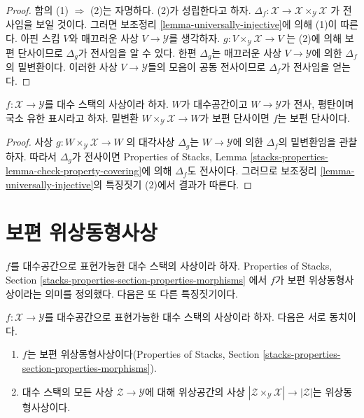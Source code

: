 \begin{proof}
함의 (1) $\Rightarrow$ (2)는 자명하다. (2)가 성립한다고 하자.
$\Delta_f : \mathcal{X} \to \mathcal{X} \times_\mathcal{Y} \mathcal{X}$
가 전사임을 보일 것이다. 그러면 보조정리
\ref{lemma-universally-injective}에 의해 (1)이 따른다.
아핀 스킴 $V$와 매끄러운 사상 $V \to \mathcal{Y}$를 생각하자.
$g : V \times_\mathcal{Y} \mathcal{X} \to V$
는 (2)에 의해 보편 단사이므로 $\Delta_g$가 전사임을 알 수 있다.
한편 $\Delta_g$는 매끄러운 사상 $V \to \mathcal{Y}$에 의한
$\Delta_f$의 밑변환이다. 이러한 사상 $V \to \mathcal{Y}$들의 모음이
공동 전사이므로 $\Delta_f$가 전사임을 얻는다.
\end{proof}

\begin{lemma}
\label{lemma-check-universally-injective-covering}
$f : \mathcal{X} \to \mathcal{Y}$를 대수 스택의 사상이라 하자.
$W$가 대수공간이고 $W \to \mathcal{Y}$가 전사, 평탄이며
국소 유한 표시라고 하자. 밑변환
$W \times_\mathcal{Y} \mathcal{X} \to W$가 보편 단사이면
$f$는 보편 단사이다.
\end{lemma}

\begin{proof}
사상
$g : W \times_\mathcal{Y} \mathcal{X} \to W$
의 대각사상 $\Delta_g$는 $W \to \mathcal{Y}$에 의한 $\Delta_f$의
밑변환임을 관찰하자. 따라서 $\Delta_g$가 전사이면 Properties of Stacks,
Lemma \ref{stacks-properties-lemma-check-property-covering}에 의해
$\Delta_f$도 전사이다. 그러므로 보조정리
\ref{lemma-universally-injective}의 특징짓기 (2)에서 결과가 따른다.
\end{proof}








\section{보편 위상동형사상}
\label{section-universal-homeomorphisms}

\noindent
$f$를 대수공간으로 표현가능한 대수 스택의 사상이라 하자.
Properties of Stacks, Section
\ref{stacks-properties-section-properties-morphisms}
에서 $f$가 보편 위상동형사상이라는 의미를 정의했다. 다음은 또 다른
특징짓기이다.

\begin{lemma}
\label{lemma-characterize-representable-universal-homeomorphism}
$f : \mathcal{X} \to \mathcal{Y}$를 대수공간으로 표현가능한
대수 스택의 사상이라 하자. 다음은 서로 동치이다.
\begin{enumerate}
\item $f$는 보편 위상동형사상이다(Properties of Stacks, Section
\ref{stacks-properties-section-properties-morphisms}).
\item 대수 스택의 모든 사상 $\mathcal{Z} \to \mathcal{Y}$에 대해
위상공간의 사상
$|\mathcal{Z} \times_\mathcal{Y} \mathcal{X}| \to |\mathcal{Z}|$는
위상동형사상이다.
\end{enumerate}
\end{lemma}


